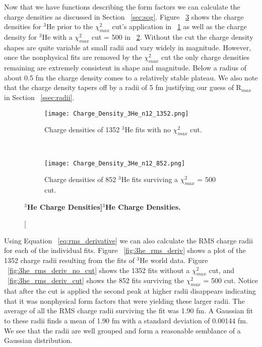 Now that we have functions describing the form factors we can calculate the charge densities as discussed in Section ~\ref{sec:sog}. Figure ~\ref{fig:3he_charge_density} shows the charge densities for $^3$He prior to the $\chi^2_{max}$ cut's application in ~\ref{fig:3he_charge_density_no_cut} as well as the charge density for $^3$He with a $\chi^2_{max}$ cut = 500 in ~\ref{fig:3he_charge_density_cut}. Without the cut the charge density shapes are quite variable at small radii and vary widely in magnitude. However, once the nonphysical fits are removed by the $\chi^2_{max}$ cut the only charge densities remaining are extremely consistent in shape and magnitude. Below a radius of about 0.5 fm the charge density comes to a relatively stable plateau. We also note that the charge density tapers off by a radii of 5 fm justifying our guess of R$_{max}$ in Section ~\ref{ssec:radii}. %

\begin{figure}[!ht]
\begin{subfigure}{1.\textwidth}
  \centering
  \texttt{[image: Charge\_Density\_3He\_n12\_1352.png]}
  \caption{Charge densities of 1352 $^3$He fits with no $\chi^2_{max}$ cut.}
  \label{fig:3he_charge_density_no_cut}
\end{subfigure}\\
\begin{subfigure}{1.\textwidth}
  \centering
  \texttt{[image: Charge\_Density\_3He\_n12\_852.png]}
  \caption{Charge densities of 852 $^3$He fits surviving a $\chi^2_{max}$ = 500 cut.}
  \label{fig:3he_charge_density_cut}
\end{subfigure}
\caption[\bf{$^3$He Charge Densities}]{\bf{$^3$He Charge Densities.}}
\label{fig:3he_charge_density}
\end{figure}

Using Equation ~\ref{eq:rms_derivative} we can also calculate the RMS charge radii for each of the individual fits. Figure ~\ref{fig:3he_rms_deriv} shows a plot of the 1352 charge radii resulting from the fits of $^3$He world data. Figure ~\ref{fig:3he_rms_deriv_no_cut} shows the 1352 fits without a $\chi^2_{max}$ cut, and ~\ref{fig:3he_rms_deriv_cut} shows the 852 fits surviving the $\chi^2_{max}$ = 500 cut. Notice that after the cut is applied the second peak at higher radii disappears indicating that it was nonphysical form factors that were yielding these larger radii. The average of all the RMS charge radii surviving the fit was 1.90 fm. A Gaussian fit to these radii finds a mean of 1.90 fm with a standard deviation of 0.00144 fm. We see that the radii are well grouped and form a reasonable semblance of a Gaussian distribution. %

